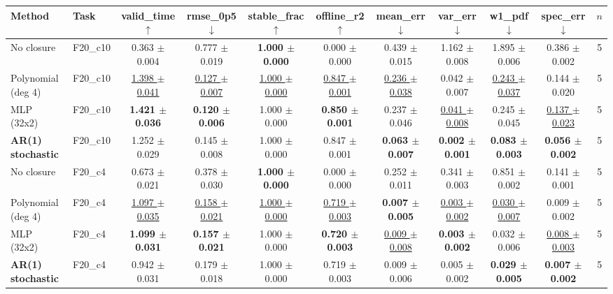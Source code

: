 \begin{tabular}{llccccccccc}
\toprule
Method & Task & valid\_time $\uparrow$ & rmse\_0p5 $\downarrow$ & stable\_frac $\uparrow$ & offline\_r2 $\uparrow$ & mean\_err $\downarrow$ & var\_err $\downarrow$ & w1\_pdf $\downarrow$ & spec\_err $\downarrow$ & $n$ \\
\midrule
No closure & F20\_c10 & 0.363 $\pm$ 0.004 & 0.777 $\pm$ 0.019 & \textbf{1.000 $\pm$ 0.000} & 0.000 $\pm$ 0.000 & 0.439 $\pm$ 0.015 & 1.162 $\pm$ 0.008 & 1.895 $\pm$ 0.006 & 0.386 $\pm$ 0.002 & 5 \\
Polynomial (deg 4) & F20\_c10 & \underline{1.398 $\pm$ 0.041} & \underline{0.127 $\pm$ 0.007} & \underline{1.000 $\pm$ 0.000} & \underline{0.847 $\pm$ 0.001} & \underline{0.236 $\pm$ 0.038} & 0.042 $\pm$ 0.007 & \underline{0.243 $\pm$ 0.037} & 0.144 $\pm$ 0.020 & 5 \\
MLP (32x2) & F20\_c10 & \textbf{1.421 $\pm$ 0.036} & \textbf{0.120 $\pm$ 0.006} & 1.000 $\pm$ 0.000 & \textbf{0.850 $\pm$ 0.001} & 0.237 $\pm$ 0.046 & \underline{0.041 $\pm$ 0.008} & 0.245 $\pm$ 0.045 & \underline{0.137 $\pm$ 0.023} & 5 \\
\textbf{AR(1) stochastic} & F20\_c10 & 1.252 $\pm$ 0.029 & 0.145 $\pm$ 0.008 & 1.000 $\pm$ 0.000 & 0.847 $\pm$ 0.001 & \textbf{0.063 $\pm$ 0.007} & \textbf{0.002 $\pm$ 0.001} & \textbf{0.083 $\pm$ 0.003} & \textbf{0.056 $\pm$ 0.002} & 5 \\
\midrule
No closure & F20\_c4 & 0.673 $\pm$ 0.021 & 0.378 $\pm$ 0.030 & \textbf{1.000 $\pm$ 0.000} & 0.000 $\pm$ 0.000 & 0.252 $\pm$ 0.011 & 0.341 $\pm$ 0.003 & 0.851 $\pm$ 0.002 & 0.141 $\pm$ 0.001 & 5 \\
Polynomial (deg 4) & F20\_c4 & \underline{1.097 $\pm$ 0.035} & \underline{0.158 $\pm$ 0.021} & \underline{1.000 $\pm$ 0.000} & \underline{0.719 $\pm$ 0.003} & \textbf{0.007 $\pm$ 0.005} & \underline{0.003 $\pm$ 0.002} & \underline{0.030 $\pm$ 0.007} & 0.009 $\pm$ 0.002 & 5 \\
MLP (32x2) & F20\_c4 & \textbf{1.099 $\pm$ 0.031} & \textbf{0.157 $\pm$ 0.021} & 1.000 $\pm$ 0.000 & \textbf{0.720 $\pm$ 0.003} & \underline{0.009 $\pm$ 0.008} & \textbf{0.003 $\pm$ 0.002} & 0.032 $\pm$ 0.006 & \underline{0.008 $\pm$ 0.003} & 5 \\
\textbf{AR(1) stochastic} & F20\_c4 & 0.942 $\pm$ 0.031 & 0.179 $\pm$ 0.018 & 1.000 $\pm$ 0.000 & 0.719 $\pm$ 0.003 & 0.009 $\pm$ 0.006 & 0.005 $\pm$ 0.002 & \textbf{0.029 $\pm$ 0.005} & \textbf{0.007 $\pm$ 0.002} & 5 \\
\bottomrule
\end{tabular}
